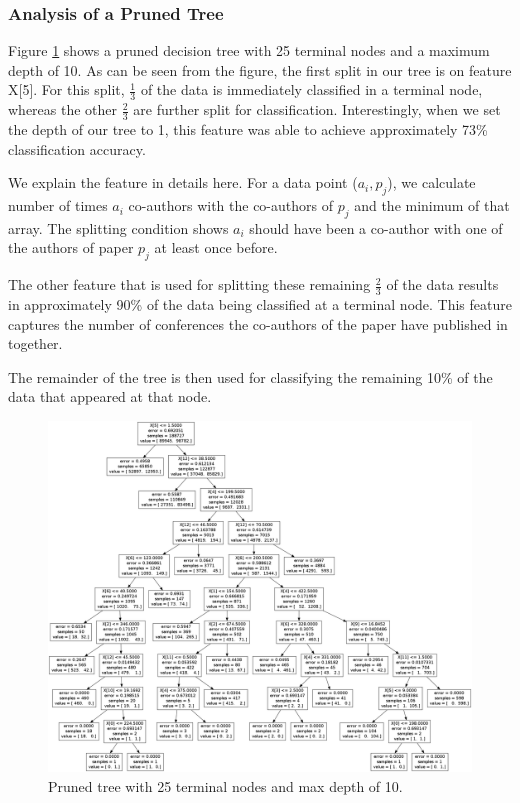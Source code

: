 \documentclass[letterpaper,12pt]{article}
\begin{document}
\subsubsection{Analysis of a Pruned Tree}
Figure \ref{fig:tree} shows a pruned decision tree with 25 terminal nodes and a maximum depth of 10. As can be seen from the figure, the first split in our tree is on feature X[5]. For this split, $\frac{1}{3}$ of the data is immediately classified in a terminal node, whereas the other $\frac{2}{3}$ are further split for classification. Interestingly, when we set the depth of our tree to 1, this feature was able to achieve approximately 73\% classification accuracy. 

We explain the feature in details here. For a data point ($a_i, p_j$), we calculate number of times $a_i$ co-authors with the co-authors of $p_j$ and the minimum of that array. The splitting condition shows $a_i$ should have been a co-author with one of the authors of paper $p_j$ at least once before.

The other feature that is used for splitting these remaining $\frac{2}{3}$ of the data results in approximately 90\% of the data being classified at a terminal node. This feature captures the number of conferences the co-authors of the paper have published in together.

The remainder of the tree is then used for classifying the remaining 10\% of the data that appeared at that node.


\begin{figure}[ht!]
\includegraphics[width=\textwidth]{boss.png}
\caption{Pruned tree with 25 terminal nodes and max depth of 10.}\label{fig:tree}
\end{figure}
\end{document}
